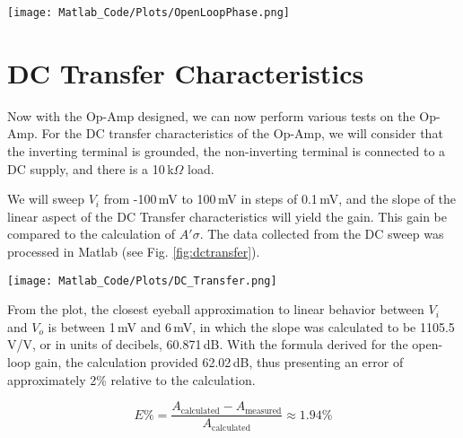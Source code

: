 \documentclass[lettersize,journal]{IEEEtran}
\begin{document}
\begin{figure*}[!t]
  \centering
  \texttt{[image: Matlab\_Code/Plots/OpenLoopPhase.png]}
  \caption{Bode Plot of Open-Loop Phase} 
  \label{fig:openloopphaseBode}
  \hrulefill
\end{figure*}

\section{DC Transfer Characteristics}
Now with the Op-Amp designed, we can now perform various tests on the 
Op-Amp. For the DC transfer characteristics of the Op-Amp, we will consider 
that the inverting terminal is grounded, the non-inverting terminal is 
connected to a DC supply, and there is a 10$\,$k$\Omega$ load.

\begin{figure}[H]
  \centering
\end{figure}

We will sweep $V_i$ from -100$\,$mV to 100$\,$mV in steps of 0.1$\,$mV, and the slope of the 
linear aspect of the DC Transfer characteristics will yield the gain. This 
gain be compared to the calculation of $A'\sigma$. The data collected from the 
DC sweep was processed in Matlab (see Fig. \ref{fig:dctransfer}).

\begin{figure*}[!t]
  \centering
  \texttt{[image: Matlab\_Code/Plots/DC\_Transfer.png]}
  \caption{DC Transfer Characteristics}
  \label{fig:dctransfer}
\hrulefill
\end{figure*}

From the plot, the closest eyeball approximation to linear behavior between $V_i$ and 
$V_o$ is between 1$\,$mV and 6$\,$mV, in which the slope was calculated to be 1105.5$\,$V/V, or in 
units of decibels, 60.871$\,$dB. With the formula derived for the open-loop gain, the 
calculation provided 62.02$\,$dB, thus presenting an error of approximately 2\% 
relative to the calculation.

\begin{equation}
  E\% = \frac{A_{\text{calculated}} - A_{\text{measured}}}{A_{\text{calculated}}} \approx 1.94\% 
\end{equation}
\end{document}
